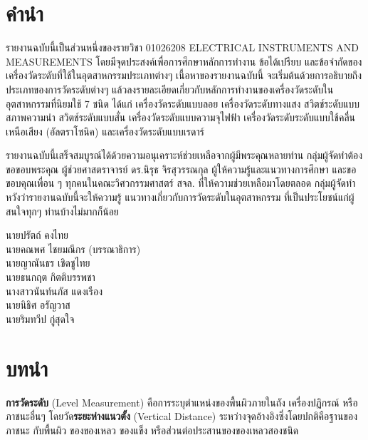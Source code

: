 \documentclass[final,11pt,a4paper]{article}
\begin{document}
\section*{คำนำ}
รายงานฉบับนี้เป็นส่วนหนึ่งของรายวิชา 01026208 ELECTRICAL INSTRUMENTS AND MEASUREMENTS 
โดยมีจุดประสงค์เพื่อการศึกษาหลักการทำงาน ข้อได้เปรียบ และข้อจำกัดของเครื่องวัดระดับที่ใช้ในอุตสาหกรรมประเภทต่างๆ 
เนื้อหาของรายงานฉบับนี้ จะเริ่มต้นด้วยการอธิบายถึงประเภทของการวัดระดับต่างๆ แล้วลงรายละเอียดเกี่ยวกับหลักการทำงานของเครื่องวัดระดับในอุตสาหกรรมที่นิยมใช้
7 ชนิด ได้แก่ เครื่องวัดระดับแบบลอย เครื่องวัดระดับทางแสง สวิตช์ระดับแบบสภาพความนำ สวิตช์ระดับแบบสั่น เครื่องวัดระดับแบบความจุไฟฟ้า 
เครื่องวัดระดับระดับแบบใช้คลื่นเหนือเสียง (อัลตราโซนิค) และเครื่องวัดระดับแบบเรดาร์

รายงานฉบับนี้เสร็จสมบูรณ์ได้ด้วยความอนุเคราะห์ช่วยเหลือจากผู้มีพระคุณหลายท่าน กลุ่มผู้จัดทำต้องขอขอบพระคุณ 
ผู้ช่วยศาสตราจารย์ ดร.นิรุธ จิรสุวรรณกุล ผู้ให้ความรู้และแนวทางการศึกษา และขอขอบคุณเพื่อน ๆ ทุกคนในคณะวิศวกรรมศาสตร์ สจล. ที่ให้ความช่วยเหลือมาโดยตลอด 
กลุ่มผู้จัดทำหวังว่ารายงานฉบับนี้จะให้ความรู้ แนวทางเกี่ยวกับการวัดระดับในอุตสาหกรรม ที่เป็นประโยชน์แก่ผู้สนใจทุกๆ ท่านบ้างไม่มากก็น้อย 

\vspace{1cm}
\hspace{9cm}
\vbox{\noindent
    นายปรัตถ์ คงไทย\\
    นายคณพศ ไชยมณีกร (บรรณาธิการ)\\
    นายญาณันธร เชิดชูไทย\\
    นายธนกฤต กิตติบรรพชา\\
    นางสาวนันท์นภัส แดงเรือง\\
    นายนิธิศ อรัญวาส\\
    นายริมทวีป กู่สุดใจ\\

}
\newpage
\renewcommand\contentsname{สารบัญ}
\tableofcontents
\newpage
\section{บทนำ}
\textbf{การวัดระดับ} (Level Measurement) คือการระบุตำแหน่งของพื้นผิวภายในถัง เครื่องปฏิกรณ์
หรือภาชนะอื่นๆ โดยวัด\textbf{ระยะห่างแนวตั้ง} (Vertical Distance) ระหว่างจุดอ้างอิงซึ่งโดยปกติคือฐานของภาชนะ กับพื้นผิว
ของของเหลว ของแข็ง หรือส่วนต่อประสานของของเหลวสองชนิด
\end{document}
